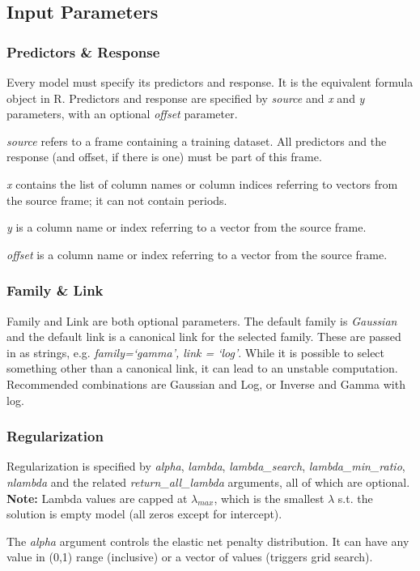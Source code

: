 \documentclass[11pt]{article}
\begin{document}
\subsection{Input Parameters}
\subsubsection{Predictors \& Response}
Every model must specify its predictors and response. It is the equivalent formula object in R. Predictors and response are specified by \textit{source} and \textit{x} and \textit{y} parameters, with an optional \textit{offset} parameter. 

\textit{source} refers to a frame containing a training dataset. All predictors and the response (and offset, if there is one) must be part of this frame.

\textit{x} contains the list of column names or column indices referring to vectors from the source frame; it can not contain periods.

\textit{y} is a column name or index referring to a vector from the source frame.

\textit{offset} is a column name or index referring to a vector from the source frame.
  
\subsubsection{Family \& Link}
Family and Link are both optional parameters. The default family is \textit{Gaussian} and the default link is a canonical link for the selected family. These are passed in as strings, e.g. \textit{family=`gamma', link = `log'}.
While it is possible to select something other than a canonical link, it can lead to an unstable computation. Recommended combinations are Gaussian and Log, or Inverse and Gamma with log.  

\subsubsection{Regularization}
Regularization is specified by \textit{alpha}, \textit{lambda}, \textit{lambda\_search}, \textit{lambda\_min\_ratio}, \textit{nlambda} and the related \textit{return\_all\_lambda} arguments, all of which are optional. 
\textbf{Note:} Lambda values are capped at $\lambda_{max}$, which is the smallest $\lambda$ s.t. the solution is empty model (all zeros except for intercept).

The \textit{alpha} argument controls the elastic net penalty distribution. It can have any value in (0,1) range (inclusive) or a vector of values (triggers grid search).
\end{document}
